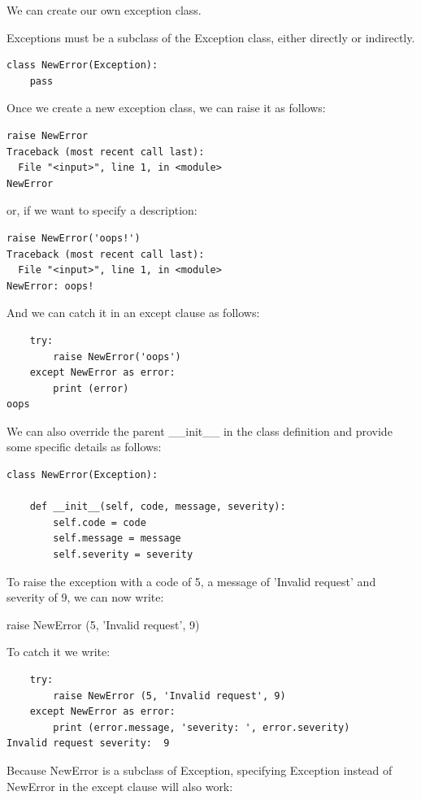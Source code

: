 \documentclass{article}
\begin{document}
We can create our own exception class.

Exceptions must be a subclass of the Exception class, either directly or indirectly. 

\begin{lstlisting}
class NewError(Exception): 
    pass
\end{lstlisting}

Once we create a new exception class, we can raise it as follows:

\begin{lstlisting}
raise NewError
Traceback (most recent call last):
  File "<input>", line 1, in <module>
NewError
\end{lstlisting}

or, if we want to specify a description:

\begin{lstlisting}
raise NewError('oops!')
Traceback (most recent call last):
  File "<input>", line 1, in <module>
NewError: oops!
\end{lstlisting}
 
And we can catch it in an except clause as follows:
\begin{lstlisting}
    try:
        raise NewError('oops')
    except NewError as error:
        print (error)
oops
\end{lstlisting}

We can also override the parent {\_}{\_}init{\_}{\_}  in the class definition and provide some specific details as follows:

\begin{lstlisting}
class NewError(Exception):
 
    def __init__(self, code, message, severity):
        self.code = code
        self.message = message
        self.severity = severity
\end{lstlisting}

To raise the exception with a code of 5, a message of 'Invalid request' and severity of 9, we can now write:

raise NewError (5, 'Invalid request', 9)

To catch it  we write:

\begin{lstlisting}
    try:
        raise NewError (5, 'Invalid request', 9)
    except NewError as error:
        print (error.message, 'severity: ', error.severity)
Invalid request severity:  9
\end{lstlisting}

Because NewError is a subclass of Exception, specifying Exception instead of NewError in the except clause will also work:
\end{document}
